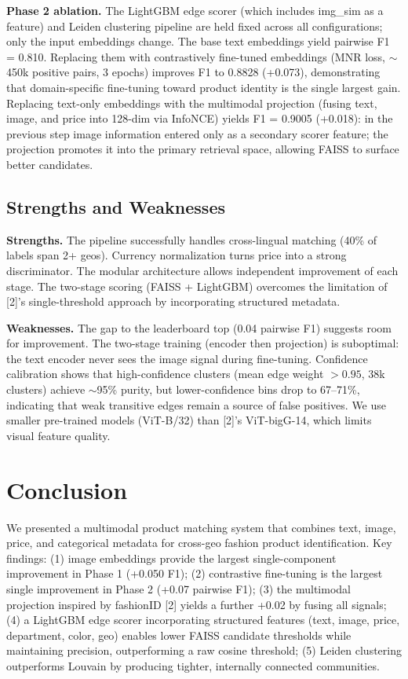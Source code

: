 \documentclass[10pt,twocolumn,a4paper]{article}
\begin{document}
\textbf{Phase 2 ablation.} The LightGBM edge scorer (which includes img\_sim as a feature) and Leiden clustering pipeline are held fixed across all configurations; only the input embeddings change. The base text embeddings yield pairwise F1 = 0.810. Replacing them with contrastively fine-tuned embeddings (MNR loss, $\sim$450k positive pairs, 3 epochs) improves F1 to 0.8828 (+0.073), demonstrating that domain-specific fine-tuning toward product identity is the single largest gain. Replacing text-only embeddings with the multimodal projection (fusing text, image, and price into 128-dim via InfoNCE) yields F1 = 0.9005 (+0.018): in the previous step image information entered only as a secondary scorer feature; the projection promotes it into the primary retrieval space, allowing FAISS to surface better candidates.

\subsection{Strengths and Weaknesses}
\textbf{Strengths.} The pipeline successfully handles cross-lingual matching (40\% of labels span 2+ geos). Currency 
normalization turns price into a strong discriminator. The modular architecture allows independent improvement of each stage. 
The two-stage scoring (FAISS + LightGBM) overcomes the limitation of [2]'s single-threshold approach by incorporating structured 
metadata.

\textbf{Weaknesses.} The gap to the leaderboard top (0.04 pairwise F1) suggests room for improvement. The two-stage training (encoder then projection) is suboptimal: the text encoder never sees the image signal during fine-tuning. Confidence calibration shows that high-confidence clusters (mean edge weight $> 0.95$, 38k clusters) achieve $\sim$95\% purity, but lower-confidence bins drop to 67--71\%, indicating that weak transitive edges remain a source of false positives. We use smaller pre-trained models (ViT-B/32) than [2]'s ViT-bigG-14, which limits visual feature quality.

\section{Conclusion}
We presented a multimodal product matching system that combines text, image, price, and categorical metadata for cross-geo fashion product identification. Key findings:
(1) image embeddings provide the largest single-component improvement in Phase 1 (+0.050 F1);
(2) contrastive fine-tuning is the largest single improvement in Phase 2 (+0.07 pairwise F1);
(3) the multimodal projection inspired by fashionID [2] yields a further +0.02 by fusing all signals;
(4) a LightGBM edge scorer incorporating structured features (text, image, price, department, color, geo) enables lower FAISS candidate thresholds while maintaining precision, outperforming a raw cosine threshold;
(5) Leiden clustering outperforms Louvain by producing tighter, internally connected communities.
\end{document}
